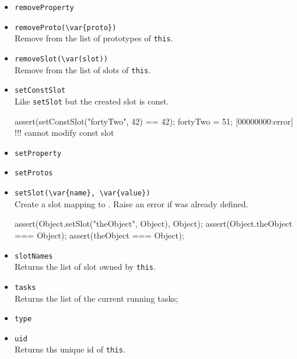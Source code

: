 \begin{itemize}
\item \lstinline|removeProperty|\\

\item \lstinline|removeProto(\var{proto})|\\
  Remove  from the list of prototypes of \lstinline|this|.

\item \lstinline|removeSlot(\var(slot))|\\
  Remove  from the list of slots of \lstinline|this|.

\item \lstinline|setConstSlot|\\
  Like \lstinline|setSlot| but the created slot is const.

\begin{urbiscript}[firstnumber=last]
assert(setConstSlot("fortyTwo", 42) == 42);
fortyTwo = 51;
[00000000:error] !!! cannot modify const slot
\end{urbiscript}

\item \lstinline|setProperty|\\

\item \lstinline|setProtos|\\

\item \lstinline|setSlot(\var{name}, \var{value})|\\
  Create a slot  mapping to . Raise an error if
   was already defined.

\begin{urbiscript}[firstnumber=last]
assert(Object.setSlot("theObject", Object), Object);
assert(Object.theObject === Object);
assert(theObject === Object);
\end{urbiscript}

\item \lstinline|slotNames|\\
  Returns the list of slot owned by \lstinline|this|.

\item \lstinline|tasks|\\
  Returns the list of the current running tasks;

\item \lstinline|type|\\

\item \lstinline|uid|\\
  Returns ths unique id of \lstinline|this|.


\end{itemize}
